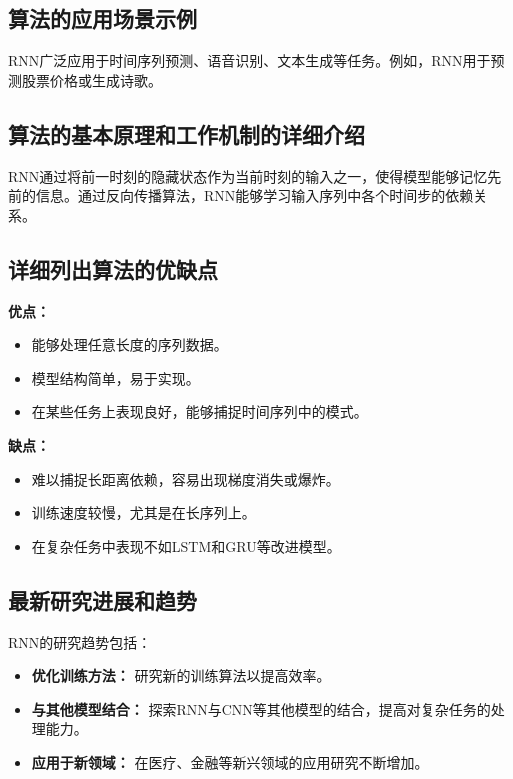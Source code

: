 \subsection*{算法的应用场景示例}
RNN广泛应用于时间序列预测、语音识别、文本生成等任务。例如，RNN用于预测股票价格或生成诗歌。

\subsection*{算法的基本原理和工作机制的详细介绍}
RNN通过将前一时刻的隐藏状态作为当前时刻的输入之一，使得模型能够记忆先前的信息。通过反向传播算法，RNN能够学习输入序列中各个时间步的依赖关系。

\subsection*{详细列出算法的优缺点}
\textbf{优点：}
\begin{itemize}
    \item 能够处理任意长度的序列数据。
    \item 模型结构简单，易于实现。
    \item 在某些任务上表现良好，能够捕捉时间序列中的模式。
\end{itemize}

\textbf{缺点：}
\begin{itemize}
    \item 难以捕捉长距离依赖，容易出现梯度消失或爆炸。
    \item 训练速度较慢，尤其是在长序列上。
    \item 在复杂任务中表现不如LSTM和GRU等改进模型。
\end{itemize}

\subsection*{最新研究进展和趋势}
RNN的研究趋势包括：
\begin{itemize}
    \item \textbf{优化训练方法：} 研究新的训练算法以提高效率。
    \item \textbf{与其他模型结合：} 探索RNN与CNN等其他模型的结合，提高对复杂任务的处理能力。
    \item \textbf{应用于新领域：} 在医疗、金融等新兴领域的应用研究不断增加。
\end{itemize}
